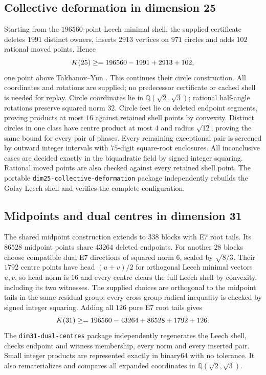 \documentclass[11pt]{amsart}
\theoremstyle{remark}
\begin{document}
\subsection{Collective deformation in dimension 25}\label{ss:d25current}

Starting from the $196560$-point Leech minimal shell, the supplied
certificate deletes $1991$ distinct owners, inserts $2913$ vertices on
$971$ circles and adds $102$ rational moved points. Hence
\[
 K(25)\ge\Kcur{25}=196560-1991+2913+102,
\]
one point above Takhanov--Yun \cite{takhanov-yun2026}. This continues
their circle construction. All coordinates and rotations are supplied;
no predecessor certificate or cached shell is needed for replay.
Circle coordinates lie in $\mathbb Q(\sqrt2,\sqrt3)$; rational half-angle
rotations preserve squared norm $32$. Circle feet lie on deleted endpoint
segments, proving products at most $16$ against retained shell points by
convexity. Distinct circles in one class have centre product at most $4$
and radius $\sqrt{12}$, proving the same bound for every pair of phases.
Every remaining exceptional pair is screened by outward integer intervals
with $75$-digit square-root enclosures. All inconclusive cases are decided
exactly in the biquadratic field by signed integer squaring. Rational
moved points are also checked against every retained shell point.
The portable \texttt{dim25-collective-deformation} package independently
rebuilds the Golay Leech shell and verifies the complete configuration.

\subsection{Midpoints and dual centres in dimension 31}\label{ss:d31current}

The shared midpoint construction extends to $338$ blocks with E7 root
tails. Its $86528$ midpoint points share $43264$ deleted endpoints.
For another $28$ blocks choose compatible dual E7 directions of squared
norm $6$, scaled by $\sqrt{8/3}$. Their $1792$ centre points have head
$(u+v)/2$ for orthogonal Leech minimal vectors $u,v$, so head norm is $16$
and every centre clears the full Leech shell by convexity, including its
two witnesses. The supplied choices are orthogonal to the midpoint tails
in the same residual group; every cross-group radical inequality is
checked by signed integer squaring. Adding all $126$ pure E7 root tails
gives
\[
 K(31)\ge\Kcur{31}=196560-43264+86528+1792+126.
\]
The \texttt{dim31-dual-centres} package independently regenerates the
Leech shell, checks endpoint and witness membership, every norm and every
inserted pair. Small integer products are represented exactly in binary64
with no tolerance. It also rematerializes and compares all expanded
coordinates in $\mathbb Q(\sqrt2,\sqrt3)$.
\end{document}
